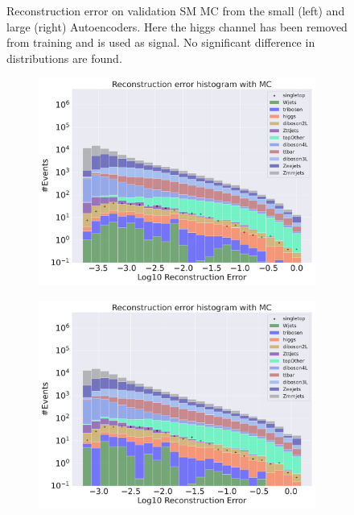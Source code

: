 \begin{figure}[h!]
\begin{subfigure}{.45\textwidth}
        \caption{ }
        \label{fig:ae_big_higgs}
    \end{subfigure}
    \hfill 
    \caption[AE | Reconstruction error using Higgs channel as signal]{Reconstruction error on validation SM MC from the small (left) and large (right) Autoencoders. Here the higgs channel has been removed from training and 
    is used as signal. No significant difference in distributions are found.  } 
    \label{fig:ae_big_channel_1}
    
\end{figure}

\begin{figure}[h!]
    \centering
    \begin{subfigure}{.45\textwidth}
        \includegraphics[width=\textwidth]{Figures/AE_testing/small/b_data_recon_big_rm3_feats_sig_singletop.pdf}
        \caption{}
        \label{fig:ae_small_singletop}
    \end{subfigure}
    \hfill
    \begin{subfigure}{.45\textwidth}
        \includegraphics[width=\textwidth]{Figures/AE_testing/big/b_data_recon_big_rm3_feats_sig_singletop.pdf}

\end{subfigure}
\end{figure}
